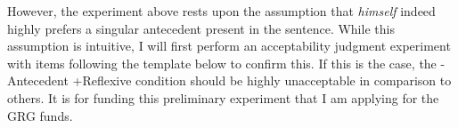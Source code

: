 \documentclass[12pt]{article}
\begin{document}
However, the experiment above rests upon the assumption that \textit{himself} indeed highly prefers a singular antecedent present in the sentence. While this assumption is intuitive, I will first perform an acceptability judgment experiment with items following the template below to confirm this. If this is the case, the -Antecedent +Reflexive condition should be highly unacceptable in comparison to others. It is for funding this preliminary experiment that I am applying for the GRG funds.
\begin{exe}
\end{exe}


\newpage

\end{document}
